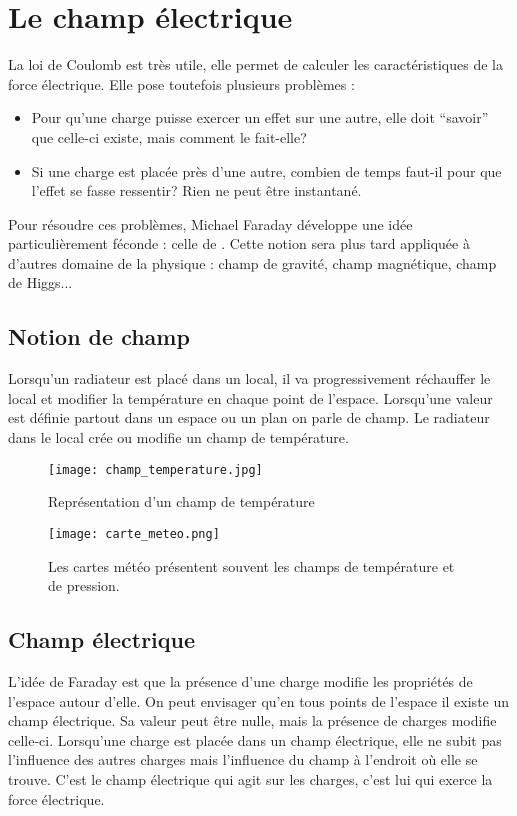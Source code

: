 \chapter{Le champ électrique}
La loi de Coulomb est très utile, elle permet de calculer les caractéristiques de la force électrique. Elle pose toutefois plusieurs problèmes :
\begin{itemize}[label=\textbullet]
    \item Pour qu'une charge puisse exercer un effet sur une autre, elle doit \enquote{savoir} que celle-ci existe, mais comment le fait-elle?
    \item Si une charge est placée près d'une autre, combien de temps faut-il pour que l'effet se fasse ressentir? Rien ne peut être instantané.
\end{itemize}

Pour résoudre ces problèmes, Michael Faraday développe une idée particulièrement féconde : celle de . Cette notion sera plus tard appliquée à d'autres domaine de la physique : champ de gravité, champ magnétique, champ de Higgs...


\section{Notion de champ}
Lorsqu'un radiateur est placé dans un local, il va progressivement réchauffer le local et modifier la température en chaque point de l'espace.
Lorsqu'une valeur est définie partout dans un espace ou un plan on parle de champ. Le radiateur dans le local crée ou modifie un champ de température.


\begin{figure}[!ht]
    \centering
    \begin{minipage}[b]{.47\linewidth}
        \centering
        \texttt{[image: champ\_temperature.jpg]}
        \caption{Représentation d'un champ de température}
        \label{champ_temperature}
    \end{minipage}
    \begin{minipage}[b]{.47\linewidth}
        \centering
        \texttt{[image: carte\_meteo.png]}
        \caption{Les cartes météo présentent souvent les champs de température et de pression.}
        \label{carte_meteo}
    \end{minipage}
\end{figure}


\newpage

\section{Champ électrique}
L'idée de Faraday est que la présence d'une charge modifie les propriétés de l'espace autour d'elle. On peut envisager qu'en tous points de l'espace il existe un champ électrique. Sa valeur peut être nulle, mais la présence de charges modifie celle-ci.
Lorsqu'une charge est placée dans un champ électrique, elle ne subit pas l'influence des autres charges mais l'influence du champ à l'endroit où elle se trouve. C'est le champ électrique qui agit sur les charges, c'est lui qui exerce la force électrique.

